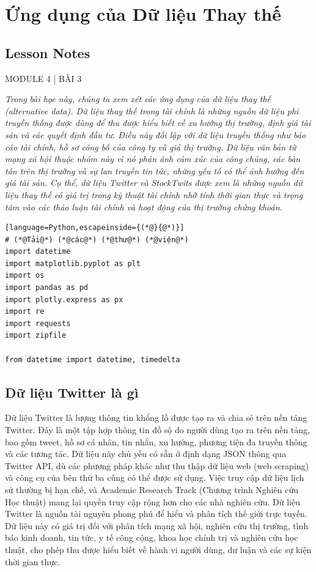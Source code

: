 \chapter{Ứng dụng của Dữ liệu Thay thế}
\label{ch:M4L3}


\section*{Lesson Notes}

MODULE 4 | BÀI 3

\emph{Trong bài học này, chúng ta xem xét các ứng dụng của dữ liệu thay thế (alternative data). Dữ liệu thay thế trong tài chính là những nguồn dữ liệu phi truyền thống được dùng để thu được hiểu biết về xu hướng thị trường, định giá tài sản và các quyết định đầu tư. Điều này đối lập với dữ liệu truyền thống như báo cáo tài chính, hồ sơ công bố của công ty và giá thị trường. Dữ liệu văn bản từ mạng xã hội thuộc nhóm này vì nó phản ánh cảm xúc của công chúng, các bàn tán trên thị trường và sự lan truyền tin tức, những yếu tố có thể ảnh hưởng đến giá tài sản. Cụ thể, dữ liệu Twitter và StockTwits được xem là những nguồn dữ liệu thay thế có giá trị trong kỹ thuật tài chính nhờ tính thời gian thực và trọng tâm vào các thảo luận tài chính và hoạt động của thị trường chứng khoán.}

\begin{lstlisting}[language=Python,escapeinside={(*@}{@*)}]
# (*@Tải@*) (*@các@*) (*@thư@*) (*@viện@*)
import datetime
import matplotlib.pyplot as plt
import os
import pandas as pd
import plotly.express as px
import re
import requests
import zipfile

from datetime import datetime, timedelta
\end{lstlisting}

\section{Dữ liệu Twitter là gì}

Dữ liệu Twitter là lượng thông tin khổng lồ được tạo ra và chia sẻ trên nền tảng Twitter. Đây là một tập hợp thông tin đồ sộ do người dùng tạo ra trên nền tảng, bao gồm tweet, hồ sơ cá nhân, tin nhắn, xu hướng, phương tiện đa truyền thông và các tương tác. Dữ liệu này chủ yếu có sẵn ở định dạng JSON thông qua Twitter API, dù các phương pháp khác như thu thập dữ liệu web (web scraping) và công cụ của bên thứ ba cũng có thể được sử dụng. Việc truy cập dữ liệu lịch sử thường bị hạn chế, và Academic Research Track (Chương trình Nghiên cứu Học thuật) mang lại quyền truy cập rộng hơn cho các nhà nghiên cứu. Dữ liệu Twitter là nguồn tài nguyên phong phú để hiểu và phân tích thế giới trực tuyến. Dữ liệu này có giá trị đối với phân tích mạng xã hội, nghiên cứu thị trường, tình báo kinh doanh, tin tức, y tế công cộng, khoa học chính trị và nghiên cứu học thuật, cho phép thu được hiểu biết về hành vi người dùng, dư luận và các sự kiện thời gian thực.

